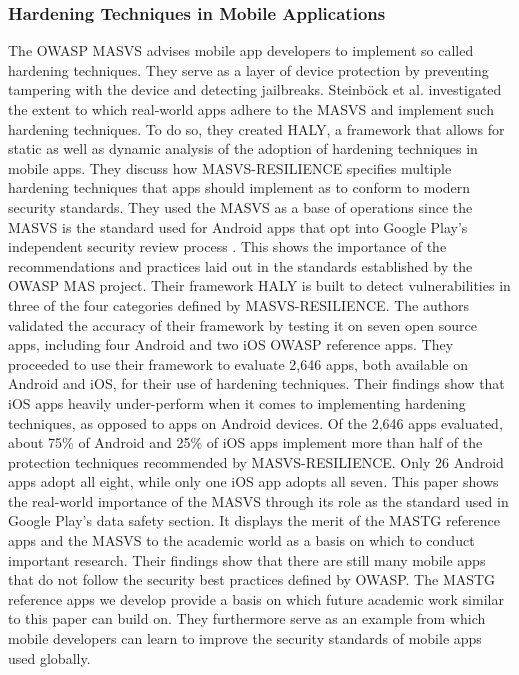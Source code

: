\subsubsection{Hardening Techniques in Mobile Applications}
The OWASP MASVS advises mobile app developers to implement so called hardening techniques. They serve as a layer of device protection by preventing tampering with the device and detecting jailbreaks. Steinböck et al. \citep{paper_22} investigated the extent to which real-world apps adhere to the MASVS and implement such hardening techniques. To do so, they created HALY, a framework that allows for static as well as dynamic analysis of the adoption of hardening techniques in mobile apps. They discuss how MASVS-RESILIENCE specifies multiple hardening techniques that apps should implement as to conform to modern security standards. They used the MASVS as a base of operations since the MASVS is the standard used for Android apps that opt into Google Play’s independent security review process \citep{paper_22}. This shows the importance of the recommendations and practices laid out in the standards established by the OWASP MAS project. Their framework HALY is built to detect vulnerabilities in three of the four categories defined by MASVS-RESILIENCE. The authors validated the accuracy of their framework by testing it on seven open source apps, including four Android and two iOS OWASP reference apps. They proceeded to use their framework to evaluate 2,646 apps, both available on Android and iOS, for their use of hardening techniques. Their findings show that iOS apps heavily under-perform when it comes to implementing hardening techniques, as opposed to apps on Android devices. Of the 2,646 apps evaluated, about 75\% of Android and 25\% of iOS apps implement more than half of the protection techniques recommended by MASVS-RESILIENCE. Only 26 Android apps adopt all eight, while only one iOS app adopts all seven. This paper shows the real-world importance of the MASVS through its role as the standard used in Google Play's data safety section. It displays the merit of the MASTG reference apps and the MASVS to the academic world as a basis on which to conduct important research. Their findings show that there are still many mobile apps that do not follow the security best practices defined by OWASP. The MASTG reference apps we develop provide a basis on which future academic work similar to this paper can build on. They furthermore serve as an example from which mobile developers can learn to improve the security standards of mobile apps used globally.